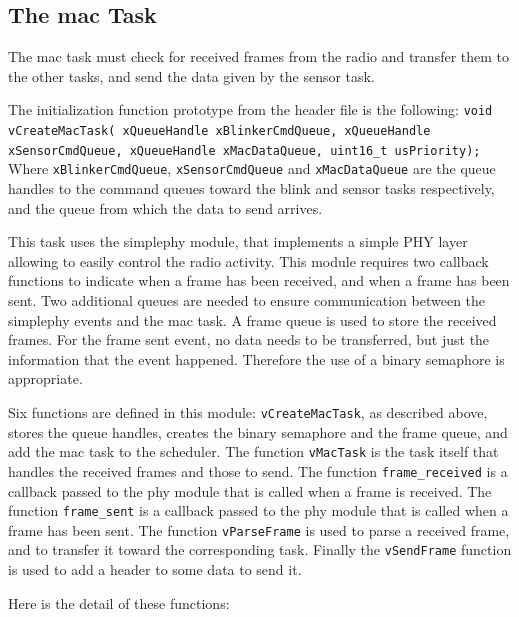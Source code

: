 \documentclass[11pt]{report}
\begin{document}
\subsection{The mac Task}

The mac task must check for received frames from the radio and transfer them to the other tasks, and send the data given by the sensor task.

The initialization function prototype from the header file is the following:
\verb$void vCreateMacTask( xQueueHandle xBlinkerCmdQueue, xQueueHandle xSensorCmdQueue, xQueueHandle xMacDataQueue, uint16_t usPriority);$
Where \verb$xBlinkerCmdQueue$, \verb$xSensorCmdQueue$ and \verb$xMacDataQueue$ are the queue handles to the command queues toward the blink and sensor tasks respectively, and the queue from which the data to send arrives.

This task uses the simplephy module, that implements a simple PHY layer allowing to easily control the radio activity. This module requires two callback functions to indicate when a frame has been received, and when a frame has been sent. Two additional queues are needed to ensure communication between the simplephy events and the mac task. A frame queue is used to store the received frames. For the frame sent event, no data needs to be transferred, but just the information that the event happened. Therefore the use of a binary semaphore is appropriate.

Six functions are defined in this module: \verb$vCreateMacTask$, as described above, stores the queue handles, creates the binary semaphore and the frame queue, and add the mac task to the scheduler. The function \verb$vMacTask$ is the task itself that handles the received frames and those to send. The function \verb$frame_received$ is a callback passed to the phy module that is called when a frame is received. The function \verb$frame_sent$ is a callback passed to the phy module that is called when a frame has been sent. The function \verb$vParseFrame$ is used to parse a received frame, and to transfer it toward the corresponding task. Finally the  \verb$vSendFrame$ function is used to add a header to some data to send it.

Here is the detail of these functions:
\end{document}

